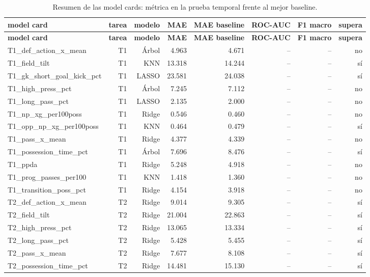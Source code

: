 {\scriptsize
\begin{longtable}{lrrrrrrr}
\caption{Resumen de las model cards: métrica en la prueba temporal frente al mejor baseline.}\label{tab:cards}\\
\toprule
\textbf{model card} & \textbf{tarea} & \textbf{modelo} & \textbf{MAE} & \textbf{MAE baseline} & \textbf{ROC-AUC} & \textbf{F1 macro} & \textbf{supera} \\
\midrule
\endfirsthead
\toprule
\textbf{model card} & \textbf{tarea} & \textbf{modelo} & \textbf{MAE} & \textbf{MAE baseline} & \textbf{ROC-AUC} & \textbf{F1 macro} & \textbf{supera} \\
\midrule
\endhead
\bottomrule
\endfoot
T1\_def\_action\_x\_mean & T1 & Árbol & 4.963 & 4.671 & -- & -- & no \\
T1\_field\_tilt & T1 & KNN & 13.318 & 14.244 & -- & -- & sí \\
T1\_gk\_short\_goal\_kick\_pct & T1 & LASSO & 23.581 & 24.038 & -- & -- & sí \\
T1\_high\_press\_pct & T1 & Árbol & 7.245 & 7.112 & -- & -- & no \\
T1\_long\_pass\_pct & T1 & LASSO & 2.135 & 2.000 & -- & -- & no \\
T1\_np\_xg\_per100poss & T1 & Ridge & 0.546 & 0.460 & -- & -- & no \\
T1\_opp\_np\_xg\_per100poss & T1 & KNN & 0.464 & 0.479 & -- & -- & sí \\
T1\_pass\_x\_mean & T1 & Ridge & 4.377 & 4.339 & -- & -- & no \\
T1\_possession\_time\_pct & T1 & Árbol & 7.696 & 8.476 & -- & -- & sí \\
T1\_ppda & T1 & Ridge & 5.248 & 4.918 & -- & -- & no \\
T1\_prog\_passes\_per100 & T1 & KNN & 1.418 & 1.360 & -- & -- & no \\
T1\_transition\_poss\_pct & T1 & Ridge & 4.154 & 3.918 & -- & -- & no \\
T2\_def\_action\_x\_mean & T2 & Ridge & 9.014 & 9.305 & -- & -- & sí \\
T2\_field\_tilt & T2 & Ridge & 21.004 & 22.863 & -- & -- & sí \\
T2\_high\_press\_pct & T2 & Ridge & 13.065 & 13.334 & -- & -- & sí \\
T2\_long\_pass\_pct & T2 & Ridge & 5.428 & 5.455 & -- & -- & sí \\
T2\_pass\_x\_mean & T2 & Ridge & 7.677 & 8.108 & -- & -- & sí \\
T2\_possession\_time\_pct & T2 & Ridge & 14.481 & 15.130 & -- & -- & sí \\

\end{longtable}}
